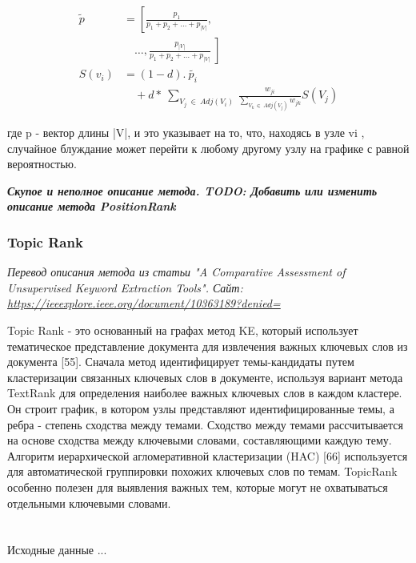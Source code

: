 \documentclass[bachelor, och, diploma ]{SCWorks}
\begin{document}
\begin{align*} \widetilde {p}&= \left [{\frac {p_{1}}{p_{1}+p_{2}+\ldots +p_{\left |{V}\right |}}, }\right. \\ &\left.{ \quad \ldots, \frac {p_{\left |{V}\right |}}{p_{1}+p_{2}+\ldots +p_{\left |{V}\right |}}~}\right] \tag{11}\\ S\left ({v_{i}}\right)&= \left ({1-d}\right).~\widetilde {p_{i}} \\ &\quad + d\ast ~\sum _{V_{j}~\in ~Adj\left ({V_{i}}\right)~}{\frac {w_{ji}}{\sum _{V_{k}~\in ~Adj\left ({V_{j}}\right)} w_{jk}} S(V_{j})} \tag{12}\end{align*}

где p - вектор длины |V|, и это указывает на то, что, находясь в узле vi , случайное блуждание может перейти к любому другому узлу на графике с равной вероятностью.

\textbf{\textit{Скупое и неполное описание метода.  TODO: Добавить или изменить описание метода PositionRank}}


\subsubsection{Topic Rank}
\textit{Перевод описания метода из статьи "A Comparative Assessment of Unsupervised Keyword Extraction Tools". Сайт: \url{https://ieeexplore.ieee.org/document/10363189?denied=}}

Topic Rank - это основанный на графах метод KE, который использует тематическое представление документа для извлечения важных ключевых слов из документа [55]. Сначала метод идентифицирует темы-кандидаты путем кластеризации связанных ключевых слов в документе, используя вариант метода TextRank для определения наиболее важных ключевых слов в каждом кластере. Он строит график, в котором узлы представляют идентифицированные темы, а ребра - степень сходства между темами. Сходство между темами рассчитывается на основе сходства между ключевыми словами, составляющими каждую тему. Алгоритм иерархической агломеративной кластеризации (HAC) [66] используется для автоматической группировки похожих ключевых слов по темам. TopicRank особенно полезен для выявления важных тем, которые могут не охватываться отдельными ключевыми словами.


\section{}

Исходные данные ... 
\end{document}
